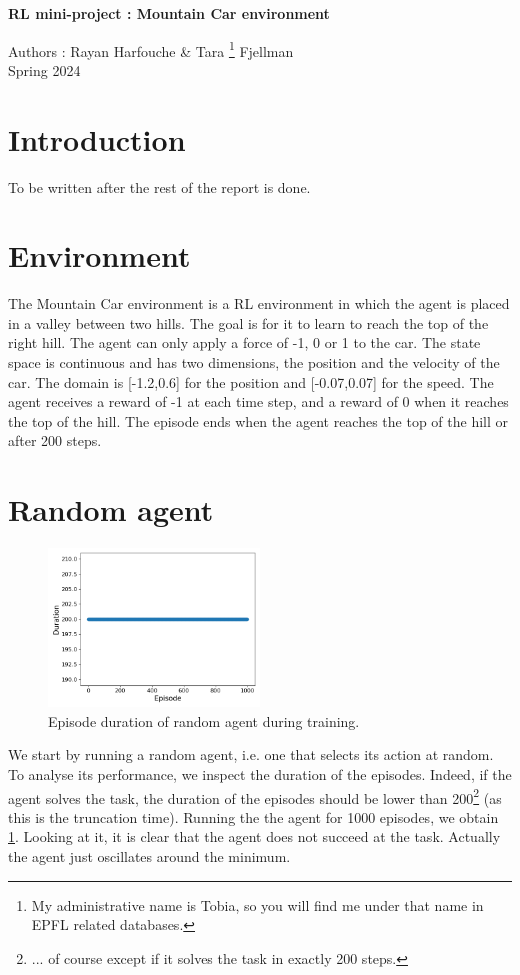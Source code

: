\documentclass[a4paper, 12pt,oneside]{article}
\begin{document}
 
	\begin{center}
	    \Large
	    \textbf{RL mini-project : Mountain Car environment}
	        
	    \vspace{0.4cm}
	    \large
	    Authors : Rayan Harfouche \& Tara \footnote[1]{My administrative name is Tobia, so you will find me under that name in EPFL related databases.} Fjellman \\
	    \small{Spring 2024}
	\end{center}

    \section{Introduction}
        To be written after the rest of the report is done.

    \section{Environment}
        The Mountain Car environment is a RL environment in which the agent is placed in a valley between two hills. The goal is for it to learn to reach the top of the right hill. The agent can only apply a force of -1, 0 or 1 to the car. The state space is continuous and has two dimensions, the position and the velocity of the car. The domain is [-1.2,0.6] for the position and [-0.07,0.07] for the speed. The agent receives a reward of -1 at each time step, and a reward of 0 when it reaches the top of the hill. The episode ends when the agent reaches the top of the hill or after 200 steps. 
    \section{Random agent}
    \begin{figure}
        \centering
        \vspace{-3em}
        \includegraphics[width=0.5\textwidth]{../runs/random/n_eps=1000/figs/duration}
        \caption{Episode duration of random agent during training.}
        \label{fig:random-neps=1000}
    \end{figure}
    We start by running a random agent, i.e. one that selects its action at random. To analyse its performance, we inspect the duration of the episodes. Indeed, if the agent solves the task, the duration of the episodes should be lower than 200\footnote[2]{... of course except if it solves the task in exactly 200 steps.} (as this is the truncation time).
    Running the the agent for 1000 episodes, we obtain \ref{fig:random-neps=1000}. Looking at it, it is clear that the agent does not succeed at the task. Actually the agent just oscillates around the minimum.
\end{document}
